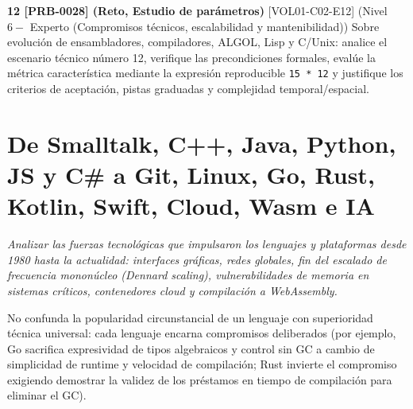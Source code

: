 \documentclass{book}
\begin{document}
\begin{tcolorbox}[title={Ejercicios}, studiumworked, breakable]
\noindent\textbf{12 [PRB-0028] (Reto, Estudio de parámetros)}
[VOL01-C02-E12] (Nivel \(6 -\) Experto (Compromisos técnicos, escalabilidad y mantenibilidad)) Sobre evolución de ensambladores, compiladores, ALGOL, Lisp y C/Unix: analice el escenario técnico número 12, verifique las precondiciones formales, evalúe la métrica característica mediante la expresión reproducible \texttt{15 * 12} y justifique los criterios de aceptación, pistas graduadas y complejidad temporal/espacial.
\end{tcolorbox}

\chapter{De Smalltalk, C++, Java, Python, JS y C\# a Git, Linux, Go, Rust, Kotlin, Swift, Cloud, Wasm e IA}
\label{chap:cap03-paradigmas-sistemas-y-era-moderna}

\noindent\textit{Analizar las fuerzas tecnológicas que impulsaron los lenguajes y plataformas desde 1980 hasta la actualidad: interfaces gráficas, redes globales, fin del escalado de frecuencia mononúcleo (Dennard scaling), vulnerabilidades de memoria en sistemas críticos, contenedores cloud y compilación a WebAssembly.}

\begin{tcolorbox}[title={Consejo}, studiumtip, breakable]

No confunda la popularidad circunstancial de un lenguaje con superioridad técnica universal: cada lenguaje encarna compromisos deliberados (por ejemplo, Go sacrifica expresividad de tipos algebraicos y control sin GC a cambio de simplicidad de runtime y velocidad de compilación; Rust invierte el compromiso exigiendo demostrar la validez de los préstamos en tiempo de compilación para eliminar el GC).
\end{tcolorbox}
\end{document}

